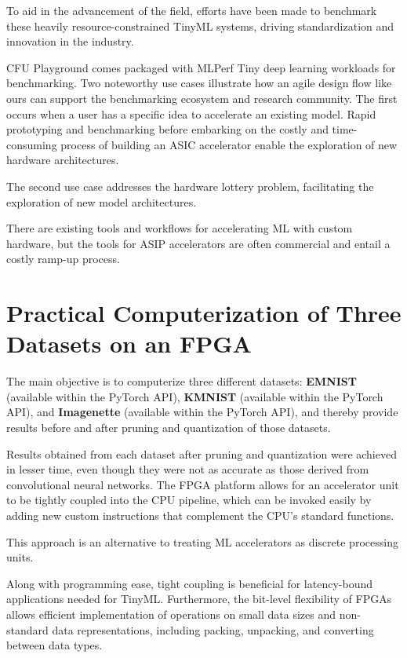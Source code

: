 \documentclass{article}
\begin{document}
To aid in the advancement of the field, efforts have been made to benchmark these heavily resource-constrained TinyML systems, driving standardization and innovation in the industry. 

CFU Playground comes packaged with MLPerf Tiny deep learning workloads for benchmarking. Two noteworthy use cases illustrate how an agile design flow like ours can support the benchmarking ecosystem and research community. The first occurs when a user has a specific idea to accelerate an existing model. Rapid prototyping and benchmarking before embarking on the costly and time-consuming process of building an ASIC accelerator enable the exploration of new hardware architectures. 

The second use case addresses the hardware lottery problem, facilitating the exploration of new model architectures.

There are existing tools and workflows for accelerating ML with custom hardware, but the tools for ASIP accelerators are often commercial and entail a costly ramp-up process.

\section{Practical Computerization of Three Datasets on an FPGA}

The main objective is to computerize three different datasets: \textbf{EMNIST} (available within the PyTorch API), \textbf{KMNIST} (available within the PyTorch API), and \textbf{Imagenette} (available within the PyTorch API), and thereby provide results before and after pruning and quantization of those datasets.

Results obtained from each dataset after pruning and quantization were achieved in lesser time, even though they were not as accurate as those derived from convolutional neural networks. The FPGA platform allows for an accelerator unit to be tightly coupled into the CPU pipeline, which can be invoked easily by adding new custom instructions that complement the CPU’s standard functions.

This approach is an alternative to treating ML accelerators as discrete processing units. 

Along with programming ease, tight coupling is beneficial for latency-bound applications needed for TinyML. Furthermore, the bit-level flexibility of FPGAs allows efficient implementation of operations on small data sizes and non-standard data representations, including packing, unpacking, and converting between data types.
\end{document}
